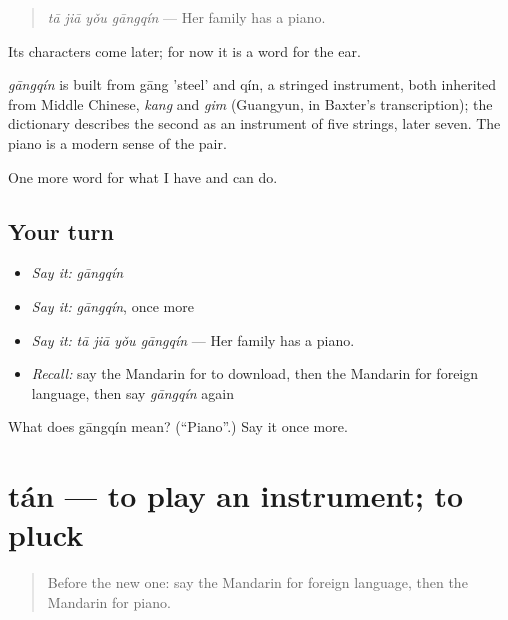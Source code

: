 \begin{quote}
\emph{tā jiā yǒu gāngqín} — Her family has a piano.
\end{quote}

Its characters come later; for now it is a word for the ear.

\begin{cousinweb}
\emph{gāngqín} is built from gāng 'steel' and qín, a stringed instrument, both inherited from Middle Chinese, \emph{kang} and \emph{gim} (Guangyun, in Baxter's transcription); the dictionary describes the second as an instrument of five strings, later seven. The piano is a modern sense of the pair.
\end{cousinweb}

\begin{grammarlens}[title={What you've built}]
One more word for what I have and can do.
\end{grammarlens}

\subsection*{Your turn}
\begin{itemize}
\raggedright
  \item \emph{Say it:} \emph{gāngqín}
  \item \emph{Say it:} \emph{gāngqín}, once more
  \item \emph{Say it:} \emph{tā jiā yǒu gāngqín} — Her family has a piano.
  \item \emph{Recall:} say the Mandarin for to download, then the Mandarin for foreign language, then say \emph{gāngqín} again
\end{itemize}

\begin{tcolorbox}[breakable,colback=teal!4,colframe=teal!35!black,title={Before you move on}]
What does gāngqín mean? (\textquotedblleft{}Piano\textquotedblright{}.) Say it once more.
\end{tcolorbox}
\section[tán]{tán — to play an instrument; to pluck}

\label{lesson:ZH-C110-tan}



\begin{quote}
Before the new one: say the Mandarin for foreign language, then the Mandarin for piano.
\end{quote}

